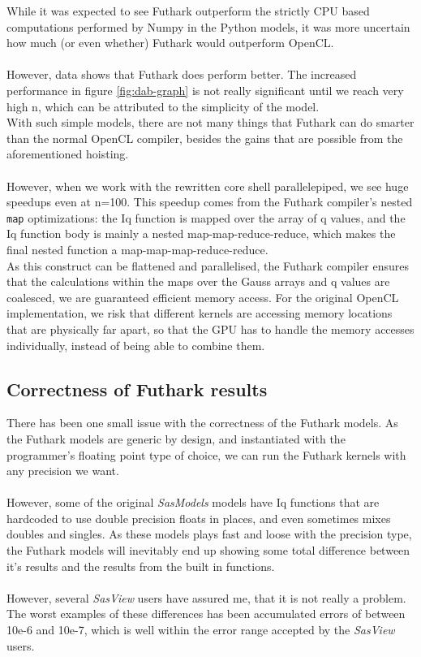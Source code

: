 \documentclass[11pt]{article}
\newcommand{\sasmodels}{\textit{SasModels}}
\newcommand{\sasview}{\textit{SasView}}
\begin{document}
\begin{mdframed}[
    frametitle={Why does Futhark perform faster than OpenCL?},
    nobreak=true]

While it was expected to see Futhark outperform the strictly CPU based 
computations performed by Numpy in the Python models, it was more uncertain
how much (or even whether) Futhark would outperform OpenCL.
\\\\
However, data shows that Futhark does perform better. The increased performance 
in figure \ref{fig:dab-graph} is not really significant until we reach very high
n, which can be attributed to the simplicity of the model.
\\
With such simple models, there are not many things that Futhark can do smarter 
than the normal OpenCL compiler, besides the gains that are possible from
the aforementioned hoisting.
\\\\
However, when we work with the rewritten core shell parallelepiped, we see huge
speedups even at n=100. This speedup comes from the Futhark compiler's 
nested \texttt{map} optimizations: the Iq function is mapped
over the array of q values, and the Iq function body is mainly a nested 
map-map-reduce-reduce, which makes the final nested function a 
map-map-map-reduce-reduce. 
\\
As this construct can be flattened 
and parallelised\cite[sec. 5]{pldi17}, the Futhark compiler ensures that the
calculations within the maps over the Gauss arrays and q values are coalesced,
we are guaranteed efficient memory access.
For the original OpenCL implementation, we risk that different kernels are
accessing memory locations that are physically far apart, so that the GPU
has to handle the memory accesses individually, instead of being able to 
combine them.
\end{mdframed}

\subsection{Correctness of Futhark results}
\label{sec:correctness}
There has been one small issue with the correctness of the Futhark models.
As the Futhark models are generic by design, and instantiated with the 
programmer's floating point type of choice, we can run the Futhark kernels
with any precision we want.
\\\\
However, some of the original \sasmodels{} models have Iq functions that are 
hardcoded to use double precision floats in places, and even sometimes mixes
doubles and singles. 
As these models plays fast and loose with the precision type, the Futhark models
will inevitably end up showing some total difference between it's results and 
the results from the built in functions.
\\\\
However, several \sasview{} users have assured me, that it is not really a 
problem. The worst examples of these differences has been accumulated errors of
between 10e-6 and 10e-7, which is well within the error range accepted by 
the \sasview{} users.
\end{document}
